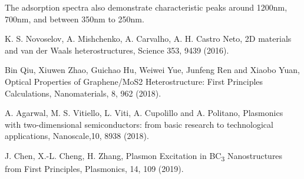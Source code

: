 \documentclass[a0paper,portrait]{baposter}
\begin{document}
\begin{poster}
{{The adsorption spectra also demonstrate characteristic peaks around 1200nm, 700nm, and between 350nm to 250nm.
\vspace{5pt}
\par[1] K. S. Novoselov, A. Mishchenko, A. Carvalho, A. H. Castro Neto, 2D materials and van der Waals heterostructures, Science 353, 9439 (2016).
\par[2] Bin Qiu, Xiuwen Zhao, Guichao Hu, Weiwei Yue, Junfeng Ren and Xiaobo Yuan, Optical Properties of Graphene/MoS2 Heterostructure: First Principles Calculations, Nanomaterials, 8, 962 (2018).
\par[3] A. Agarwal, M. S. Vitiello, L. Viti, A. Cupolillo and A. Politano, Plasmonics with two-dimensional semiconductors: from basic research to technological applications, Nanoscale,10, 8938 (2018).
\par[4] J. Chen, X.-L. Cheng, H. Zhang, Plasmon Excitation in BC\textsubscript{3} Nanostructures from First Principles, Plasmonics, 14, 109 (2019).

}
}



\end{poster}
\end{document}
